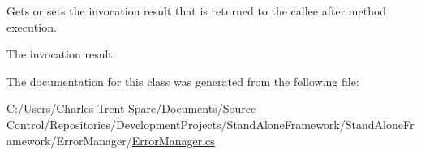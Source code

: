 Gets or sets the invocation result that is returned to the callee after method execution. 

The invocation result.

The documentation for this class was generated from the following file\+:\begin{DoxyCompactItemize}
\item 
C\+:/\+Users/\+Charles Trent Spare/\+Documents/\+Source Control/\+Repositories/\+Development\+Projects/\+Stand\+Alone\+Framework/\+Stand\+Alone\+Framework/\+Error\+Manager/\hyperlink{_error_manager_8cs}{Error\+Manager.\+cs}\end{DoxyCompactItemize}
